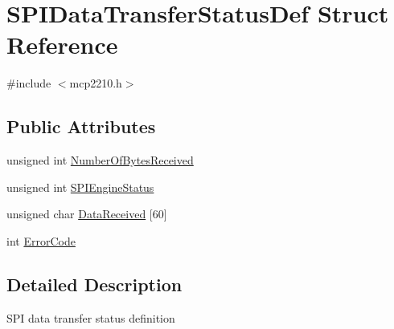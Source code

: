 \hypertarget{struct_s_p_i_data_transfer_status_def}{\section{\-S\-P\-I\-Data\-Transfer\-Status\-Def \-Struct \-Reference}
\label{struct_s_p_i_data_transfer_status_def}
}


{\ttfamily \#include $<$mcp2210.\-h$>$}

\subsection*{\-Public \-Attributes}
\begin{DoxyCompactItemize}
\item 
unsigned int \hyperlink{struct_s_p_i_data_transfer_status_def_a98b49f5e7b7da8d8785c3d4a98a67449}{\-Number\-Of\-Bytes\-Received}
\item 
unsigned int \hyperlink{struct_s_p_i_data_transfer_status_def_a4a2227f2a2c87291d918a9a3f39c5d55}{\-S\-P\-I\-Engine\-Status}
\item 
unsigned char \hyperlink{struct_s_p_i_data_transfer_status_def_a6376a62c46b37059a74995cc4ba567b3}{\-Data\-Received} \mbox{[}60\mbox{]}
\item 
int \hyperlink{struct_s_p_i_data_transfer_status_def_a202e947d5055ae583859ab2b1dddaede}{\-Error\-Code}
\end{DoxyCompactItemize}


\subsection{\-Detailed \-Description}
\-S\-P\-I data transfer status definition 

